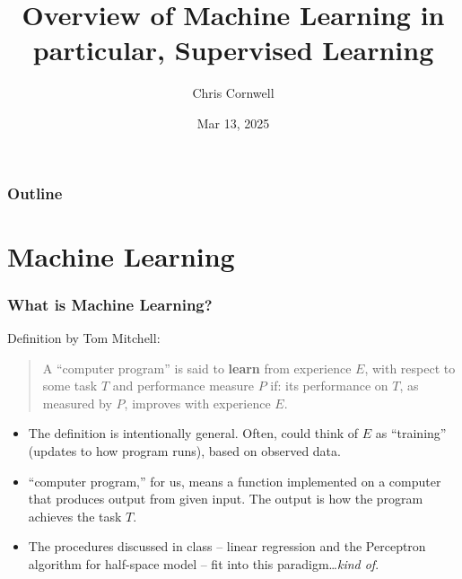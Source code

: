 \documentclass{beamer}
\author{Chris Cornwell}
\date{Mar 13, 2025}
\title{Overview of Machine Learning \newline 
    \footnotesize{in particular, Supervised Learning}}
\theoremstyle{example}
\begin{document}
\begin{frame}
\titlepage
\end{frame}

\begin{frame}
\frametitle{Outline}
\tableofcontents
\end{frame}

\section{Machine Learning}

\begin{frame}
\frametitle{What is Machine Learning?}
    Definition by Tom Mitchell:\newline 
    \begin{quote}
        A ``computer program'' is said to \textbf{learn} from experience $E$, with respect to some task $T$ and performance measure $P$ if: its performance on $T$, as measured by $P$, improves with experience $E$.
    \end{quote}
    \pause
    \begin{itemize}
        \item The definition is intentionally general. Often, could think of $E$ as ``training'' (updates to how program runs), based on observed data.
        \pause
        \item ``computer program,'' for us, means a function implemented on a computer that produces output from given input. The output is how the program achieves the task $T$. 
        \pause
        \item The procedures discussed in class {--} linear regression and the Perceptron algorithm for half-space model {--} fit into this paradigm\ldots \textit{kind of}.
    \end{itemize}

\end{frame}
\end{document}
